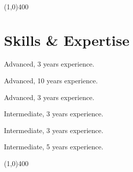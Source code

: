 \documentclass[10pt,a4paper]{article}
\newcommand{\hr}{\noindent\line(1,0){400}}
\newcommand{\CPP}{C\nolinebreak\hspace{-.05em}\raisebox{.5ex}{\tiny\textbf{++}}}
\newcommand{\CS}{C\nolinebreak\hspace{-.05em}\raisebox{.6ex}{\scriptsize\textbf\#}}
\begin{document}
\vskip 0.05in
\\

\hr
\section*{Skills \& Expertise}
\vskip 0.05in
\begin{description}
\itemsep 0pt
\item[Blockchain] Advanced, 3 years experience.
\item[C] Advanced, 10 years experience.
\item[Python] Advanced, 3 years experience.
\item[Javascript] Intermediate, 3 years experience.
\item[\CPP] Intermediate, 3 years experience.
\item[Linux/FreeBSD] Intermediate, 5 years experience.
\end{description}

\hr
\end{document}
